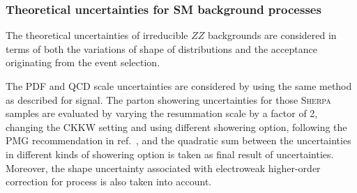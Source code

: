 %
%


\subsubsection{Theoretical uncertainties for SM background processes}

The theoretical uncertainties of irreducible $ZZ$ backgrounds are considered in terms of both the variations of shape of \mfl distributions
and the acceptance originating from the event selection.

The PDF and QCD scale uncertainties are considered by using the same method as described for signal.
The parton showering uncertainties for those \textsc{Sherpa} samples are evaluated by varying the resummation scale by a factor of 2, 
changing the CKKW setting and using different showering option, following the PMG recommendation in ref.~\cite{twiki_pmgsyst},
and the quadratic sum between the uncertainties in different kinds of showering option is taken as final result of uncertainties.
Moreover, the shape uncertainty associated with electroweak higher-order correction for \qqZZ process is also taken into account.

